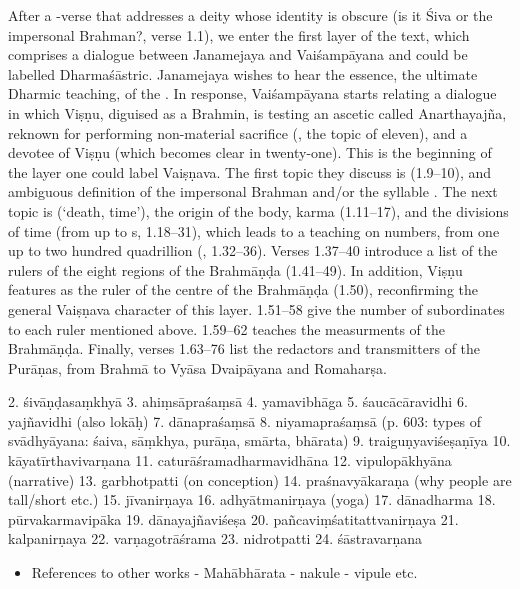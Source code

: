 \documentclass[11pt]{book}
\begin{document}
After a -verse that addresses a deity whose identity 
is obscure (is it Śiva or the impersonal Brahman?, verse 1.1), we enter the first layer 
of the text, which comprises a dialogue between Janamejaya and Vaiśampāyana and
could be labelled Dharmaśāstric.
Janamejaya wishes to hear the essence, the ultimate Dharmic teaching, 
of the \MBh. In response, Vaiśampāyana starts relating a dialogue in 
which Viṣṇu, diguised as a Brahmin, is testing an ascetic called 
Anarthayajña, reknown for performing non-material sacrifice
(, the topic of  eleven), and 
a devotee of Viṣṇu (which becomes clear in  twenty-one).
This is the beginning of the layer one could label Vaiṣṇava.
The first topic they discuss is  (1.9--10), and ambiguous 
definition of the impersonal Brahman and/or the syllable .
The next topic is  (`death, time'), the origin of the body, karma (1.11--17),
and the divisions of time (from  up to s, 1.18--31),
which leads to a teaching on numbers, from one up to two hundred quadrillion (, 1.32--36).
Verses 1.37--40 introduce a list of the rulers of the eight regions of the Brahmāṇḍa (1.41--49).
In addition, Viṣṇu features as the ruler of the centre of the Brahmāṇḍa (1.50), 
reconfirming the general Vaiṣṇava character of this layer. 
1.51--58 give the number of subordinates to each ruler mentioned above. 1.59--62 teaches
the measurments of the Brahmāṇḍa. Finally, verses 1.63--76 list the redactors and
transmitters of the Purāṇas, from Brahmā to Vyāsa Dvaipāyana and Romaharṣa.
 
 
  2. śivāṇḍasaṃkhyā 
  3. ahiṃsāpraśaṃsā 
  4. yamavibhāga
  5. śaucācāravidhi
  6. yajñavidhi (also lokāḥ)
  7. dānapraśaṃsā 
  8. niyamapraśaṃsā (p. 603: types of svādhyāyana: śaiva, sāṃkhya, purāṇa,
                    smārta, bhārata)
  9. traiguṇyaviśeṣaṇīya
  10. kāyatīrthavivarṇana
  11. caturāśramadharmavidhāna 
  12. vipulopākhyāna  (narrative)
  13. garbhotpatti (on conception)
  14. praśnavyākaraṇa (why people are tall/short etc.)
  15. jīvanirṇaya 
  16. adhyātmanirṇaya (yoga) 
  17. dānadharma
  18. pūrvakarmavipāka
  19. dānayajñaviśeṣa
  20. pañcaviṃśatitattvanirṇaya
  21. kalpanirṇaya
  22. varṇagotrāśrama
  23. nidrotpatti
  24. śāstravarṇana

\begin{itemize}

\item
  References to other works - Mahābhārata - nakule - vipule etc.
\end{itemize}
\end{document}
